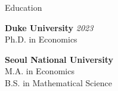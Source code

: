 

\begin{rSection}{Education}

{\bf Duke University} \hfill 
{\em 2023 } 
\\ 
Ph.D. in Economics \smallskip


{\bf Seoul National University} \hfill 
\\
M.A. in Economics
 \\
B.S. in Mathematical Science

\end{rSection}


